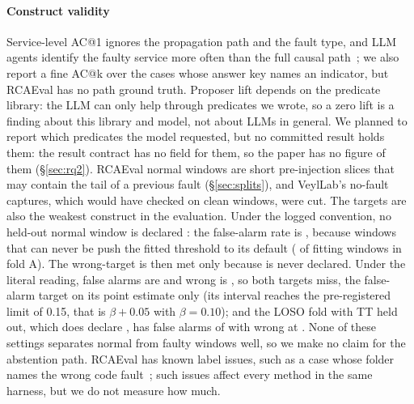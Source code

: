 \paragraph{Construct validity}
Service-level AC@1 ignores the propagation path and the fault type, and LLM agents identify the faulty service more often than the full causal path~\cite{openrca2026v2}; we also report a fine AC@k over the cases whose answer key names an indicator, but RCAEval has no path ground truth.
Proposer lift depends on the predicate library: the LLM can only help through predicates we wrote, so a zero lift is a finding about this library and model, not about LLMs in general.
We planned to report which predicates the model requested, but no committed result holds them: the result contract has no field for them, so the paper has no figure of them (\S\ref{sec:rq2}).
RCAEval normal windows are short pre-injection slices that may contain the tail of a previous fault (\S\ref{sec:splits}), and VeylLab's no-fault captures, which would have checked \NOFAULT on clean windows, were cut.
The \NOFAULT targets are also the weakest construct in the evaluation.
Under the logged convention, no held-out normal window is declared \NOFAULT: the false-alarm rate is , because windows that can never be \NOFAULT push the fitted threshold to its default ( of  fitting windows in fold A).
The wrong-\NOFAULT target is then met only because \NOFAULT is never declared.
Under the literal reading, false alarms are   and wrong \NOFAULT is , so both targets miss, the false-alarm target on its point estimate only (its interval reaches the pre-registered limit of 0.15, that is $\beta + 0.05$ with $\beta = 0.10$); and the LOSO fold with TT held out, which does declare \NOFAULT, has false alarms of  with wrong \NOFAULT at .
None of these settings separates normal from faulty windows well, so we make no claim for the abstention path.
RCAEval has known label issues, such as a case whose folder names the wrong code fault~\cite{rcaevalissue43}; such issues affect every method in the same harness, but we do not measure how much.

